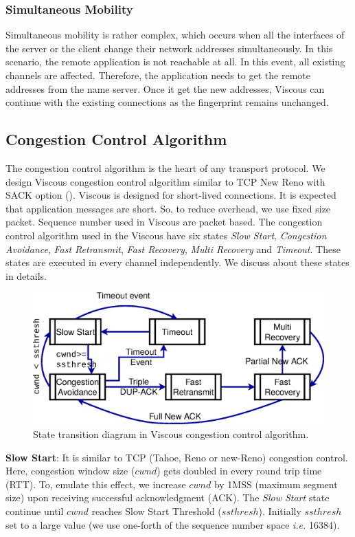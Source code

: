 \subsubsection{Simultaneous Mobility}
Simultaneous mobility is rather complex, which occurs when all the interfaces of the server or the client change their network addresses simultaneously. In this scenario, the remote application is not reachable at all. In this event, all existing channels are affected. Therefore, the application needs to get the remote addresses from the name server. Once it get the new addresses, Viscous can continue with the existing connections as the fingerprint remains unchanged.

\subsection{Congestion Control Algorithm}
\label{section:congestion_control}
The congestion control algorithm is the heart of any transport protocol. We design Viscous congestion control algorithm similar to TCP New Reno with SACK option (\cite{RFC2582,RFC2018}). Viscous is designed for short-lived connections. It is expected that application messages are short. So, to reduce overhead, we use fixed size packet. Sequence number used in Viscous are packet based. The congestion control algorithm used in the Viscous have six states {\it Slow Start}, {\it Congestion Avoidance}, {\it Fast Retransmit}, {\it Fast Recovery}, {\it Multi Recovery} and {\it Timeout}. These states are executed in every channel independently. We discuss about these states in details.

\begin{figure}[!h]
	\centering
	\includegraphics[width=0.8\linewidth]{img/cong_state_tran.eps}
	\caption{State transition diagram in Viscous congestion control algorithm.}
	\label{img:cong-state-tran}
\end{figure}

{\bf Slow Start}: It is similar to TCP (Tahoe, Reno or new-Reno) congestion control. Here, congestion window size ($cwnd$) gets doubled in every round trip time (RTT). To, emulate this effect, we increase $cwnd$ by 1MSS (maximum segment size) upon receiving successful acknowledgment (ACK). The {\it Slow Start} state continue until $cwnd$ reaches Slow Start Threshold ($ssthresh$). Initially $ssthresh$ set to a large value (we use one-forth of the sequence number space {\it i.e.} 16384). 

